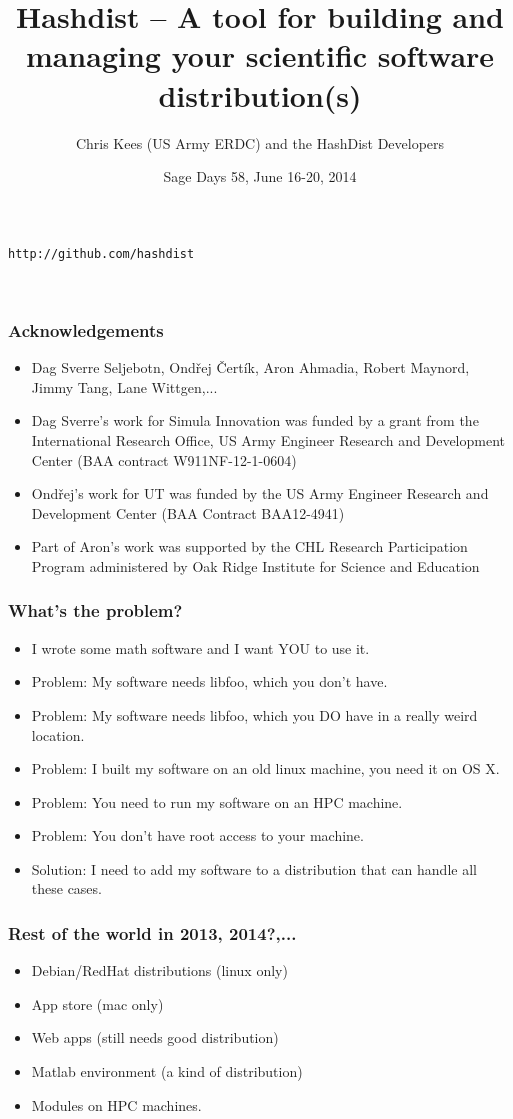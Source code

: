 \documentclass[sans,mathserif]{beamer}
\title{Hashdist -- A tool for building and managing your scientific software distribution(s)}
\author{Chris Kees (US Army ERDC) and the HashDist Developers}
\institute{Coastal and  Hydraulics Laboratory \\ U.S. Army ERDC}
\date{Sage Days 58, June 16-20, 2014}
\begin{document}
\begin{frame}
  \titlepage

  \begin{center} {\tt http://github.com/hashdist}
  \end{center}
~
\end{frame}

\begin{frame}
  \frametitle{Acknowledgements}
\begin{itemize}
\item Dag Sverre Seljebotn, Ond\v{r}ej \v{C}ert\'{i}k, Aron Ahmadia, Robert Maynord, Jimmy Tang, Lane Wittgen,...
\item Dag Sverre's work for Simula Innovation was funded by a grant from the International Research Office, US Army Engineer Research and Development Center (BAA contract W911NF-12-1-0604)
\item Ond\v{r}ej's work for UT was funded by the US Army Engineer Research and Development Center (BAA Contract BAA12-4941) 
\item Part of Aron's work was supported by the CHL Research Participation Program administered by Oak Ridge Institute for Science and Education
\end{itemize}
\end{frame}

\begin{frame}
\frametitle{What's the problem?}
\begin{itemize}
\item<+-> I wrote some math software and I want YOU to use it.
\item<+-> Problem: My software needs libfoo, which you don't have.
\item<+-> Problem: My software needs libfoo, which you  DO have in a really weird location.
\item<+-> Problem: I built my software on an old linux  machine,  you need  it on OS X.
\item<+-> Problem: You need to run my software on an HPC machine.
\item<+-> Problem: You don't have  root access to your machine.
\item<+-> Solution: I need to add my software to a distribution that can handle all these cases.
\end{itemize}
\end{frame}

\begin{frame}
  \frametitle{Rest of the world in 2013, 2014?,...}
  \begin{itemize}
    \item<+-> Debian/RedHat distributions (linux only)
    \item<+-> App store (mac only)
    \item<+-> Web apps (still needs good distribution)
    \item<+-> Matlab environment (a kind of distribution)
    \item<+-> Modules on HPC machines.
  \end{itemize}
\end{frame}
\end{document}
